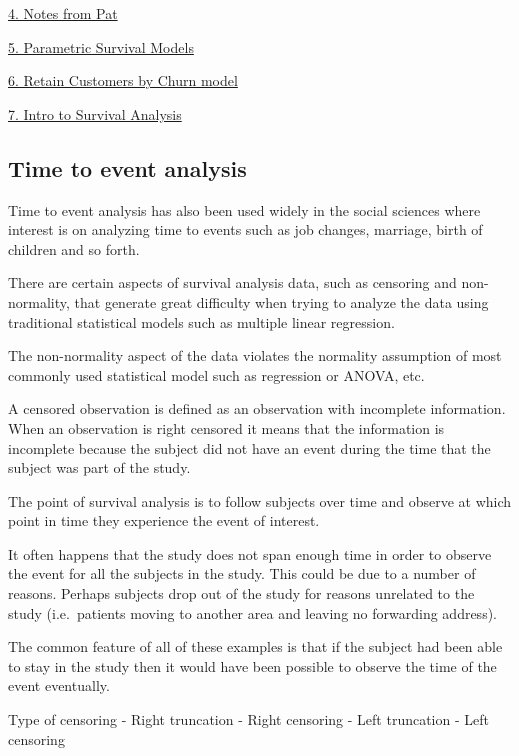 \documentclass[
]{book}
\begin{document}
\href{survival_pdf/survival_notes_pat.pdf}{4. Notes from Pat}

\href{survival_pdf/Survival_parametric.pdf}{5. Parametric Survival Models}

\href{survival_pdf/survival_retain_customers.pdf}{6. Retain Customers by Churn model}

\href{survival_pdf/survival_intro.pdf}{7. Intro to Survival Analysis}

\hypertarget{time-to-event-analysis}{%
\subsection{Time to event analysis}\label{time-to-event-analysis}}

Time to event analysis has also been used widely in the social sciences where interest is on analyzing time to events such as job changes, marriage, birth of children and so forth.

There are certain aspects of survival analysis data, such as censoring and non-normality, that generate great difficulty when trying to analyze the data using traditional statistical models such as multiple linear regression.

The non-normality aspect of the data violates the normality assumption of most commonly used statistical model such as regression or ANOVA, etc.

A censored observation is defined as an observation with incomplete information.
When an observation is right censored it means that the information is incomplete because the subject did not have an event during the time that the subject was part of the study.

The point of survival analysis is to follow subjects over time and observe at which point in time they experience the event of interest.

It often happens that the study does not span enough time in order to observe the event for all the subjects in the study. This could be due to a number of reasons. Perhaps subjects drop out of the study for reasons unrelated to the study (i.e.~patients moving to another area and leaving no forwarding address).

The common feature of all of these examples is that if the subject had been able to stay in the study then it would have been possible to observe the time of the event eventually.

Type of censoring
- Right truncation
- Right censoring
- Left truncation
- Left censoring
\end{document}
